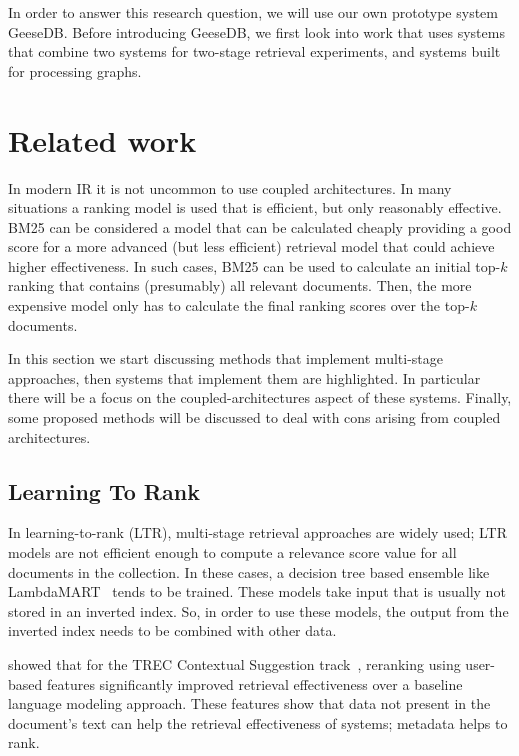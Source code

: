 In order to answer this research question, we will use our own prototype system GeeseDB. Before introducing GeeseDB, we first look into work that uses systems that combine two systems for two-stage retrieval experiments, and systems built for processing graphs.


\section{Related work }
In modern IR it is not uncommon to use coupled architectures. In many situations a ranking model is used that is efficient, but only reasonably effective. BM25 can be considered a model that can be calculated cheaply providing a good score for a more advanced (but less efficient) retrieval model that could achieve higher effectiveness. In such cases, BM25 can be used to calculate an initial top-$k$ ranking that contains (presumably) all relevant documents. Then, the more expensive model only has to calculate the final ranking scores over the top-$k$ documents.

In this section we start discussing methods that implement multi-stage approaches, then systems that implement them are highlighted. In particular there will be a focus on the coupled-architectures aspect of these systems. Finally, some proposed methods will be discussed to deal with cons arising from coupled architectures. 

\subsection{Learning To Rank}
In learning-to-rank (LTR), multi-stage retrieval approaches are widely used; LTR models are not efficient enough to compute a relevance score value for all documents in the collection.
In these cases, a decision tree based ensemble like LambdaMART~\citep{lambdamart} tends to be trained. These models take input that is usually not stored in an inverted index. So, in order to use these models, the output from the inverted index needs to be combined with other data.

 showed that for the TREC Contextual Suggestion track~\citep{contextual-suggestion-track}, reranking using user-based features significantly improved retrieval effectiveness over a baseline language modeling approach. These features show that data not present in the document's text can help the retrieval effectiveness of systems; metadata helps to rank. 

